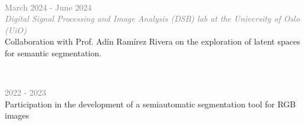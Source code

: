 

    
    


\\
\begin{small} \color{black}
\textcolor{gray}{March 2024 - June 2024\\ 
\textit{Digital Signal Processing and Image Analysis (DSB) lab at the University of Oslo (UiO)}} \\
Collaboration with Prof. Adín Ramírez Rivera on the exploration of latent spaces for semantic segmentation.
\end{small}


\vspace{.7cm}
\\
\begin{small} \color{black}
\textcolor{gray}{2022 - 2023}\\ 
Participation in the development of a semiautomatic segmentation tool for RGB images \\
\end{small}


